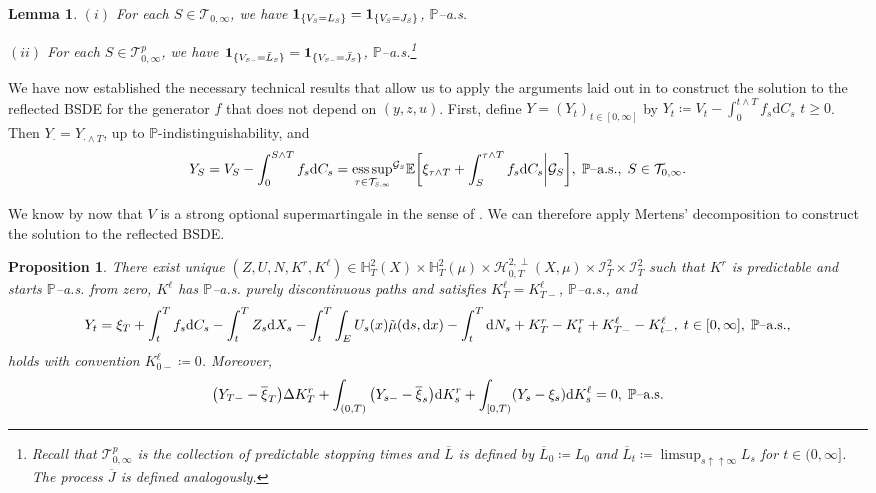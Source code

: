 \documentclass[10pt]{article} %
\newtheorem{lemma}[theorem]{Lemma}
\newtheorem{proposition}[theorem]{Proposition}
\newcommand\cG{\mathcal G}
\newcommand\cH{\mathcal H}
\newcommand\cI{\mathcal I}
\newcommand\cT{\mathcal T}
\newcommand{\smalltext}[1]{\text{\fontsize{4}{4}\selectfont$#1$}}
\def \E{\mathbb{E}}
\def \H{\mathbb{H}}
\def \P{\mathbb{P}}
\newcommand{\1}{\mathbf{1}}
\def\d{\mathrm{d}}
\DeclareMathOperator*{\esssup}{ess\,sup}
\begin{document}
\begin{lemma}\label{lem::snell_indicator}
	$(i)$ For each $S \in \cT_{0,\infty}$, we have $\mathbf{1}_{\{V_\smalltext{S} = L_\smalltext{S}\}} = \mathbf{1}_{\{V_\smalltext{S} = J_\smalltext{S}\}}$, $\P${\rm--a.s.}
	
	\medskip
	$(ii)$ For each $S \in \cT^p_{0,\infty}$, we have $\mathbf{1}_{\{V_{\smalltext{S}\smalltext{-}} = \bar L_\smalltext{S}\}} = \mathbf{1}_{\{V_{\smalltext{S}\smalltext{-}} = \bar J_\smalltext{S}\}}$, $\P${\rm--a.s.}\footnote{Recall that $\cT^p_{0,\infty}$ is the collection of predictable stopping times and $\overline L$ is defined by $\overline L_0 \coloneqq L_0$ and $\overline L_t \coloneqq \limsup_{s \uparrow\uparrow \infty} L_s$ for $t \in (0,\infty]$. The process $\overline J$ is defined analogously.}
\end{lemma}


	
We have now established the necessary technical results that allow us to apply the arguments laid out in \cite{grigorova2020optimal} to construct the solution to the reflected BSDE for the generator $f$ that does not depend on $(y,z,u)$. First, define $Y = (Y_t)_{t \in [0,\infty]}$ by $Y_t \coloneqq V_t - \int_0^{t \land T} f_s \d C_s$ $t\geq 0$. Then $Y_\cdot = Y_{\cdot \land T}$, up to $\P$-indistinguishability, and
\begin{equation*}
	Y_S = V_S - \int_0^{S \land T} f_s \d C_s = {\esssup_{\tau \in \cT_{\smalltext{S}\smalltext{,}\smalltext{\infty}}}}^{\cG_\smalltext{S}} \E\bigg[\xi_{\tau \land T} + \int_S^{\tau \land T} f_s \d C_s \bigg| \cG_S\bigg], \; \text{$\P$--a.s.}, \; S \in \cT_{0,\infty}.
\end{equation*}

We know by now that $V$ is a strong optional supermartingale in the sense of \cite[Appendix I]{dellacherie1982probabilities}. We can therefore apply Mertens' decomposition to construct the solution to the reflected BSDE.

\begin{proposition}\label{lem::snell_decomposition}
	There exist unique $(Z,U,N,K^r,K^\ell) \in \H^2_T(X) \times \H^2_T(\mu) \times \cH^{2,\perp}_{0,T}(X,\mu) \times \cI^2_T \times \cI^2_T$ such that $K^r$ is predictable and starts $\P$--{\rm a.s.} from zero, $K^\ell$ has $\P$--{\rm a.s.} purely discontinuous paths and satisfies $K^\ell_T = K^\ell_{T-}$, \textnormal{$\P$--a.s.}, and
		\begin{equation*}
			Y_t = \xi_T + \int_t^T f_s \d C_s - \int_t^T Z_s\d X_s - \int_t^T\int_E U_s(x)\tilde\mu(\d s, \d x) - \int_t^T \d N_s + K^r_T - K^r_t + K^\ell_{T-} - K^\ell_{t-}, \; t \in [0,\infty], \; \text{$\P${\rm--a.s.}},
		\end{equation*}
		holds with convention $K^\ell_{0-}\coloneqq 0$. Moreover,
	\[
		 \big(Y_{T-} - \overline{\xi}_T\big) \Delta K^r_T + \int_{(0,T)} \big(Y_{s-} - \overline{\xi}_s\big) \d K^r_s + \int_{[0,T)} (Y_s - \xi_s) \d K^\ell_s = 0, \;\text{$\P$\rm--a.s.}
	\]
\end{proposition}
\end{document}
